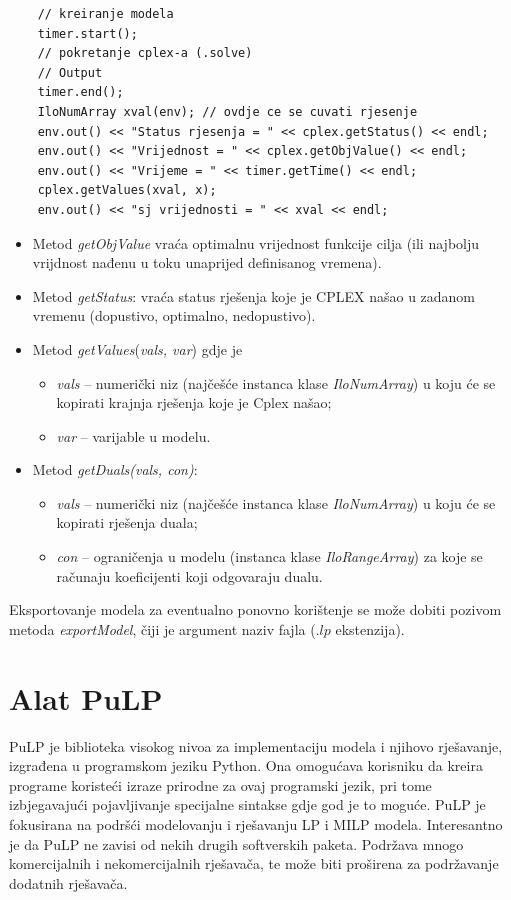 \documentclass[a4paper, utf8, 11pt, colorlinks]{book}
\begin{document}
 \begin{verbatim}
 	// kreiranje modela 
 	timer.start();
 	// pokretanje cplex-a (.solve)
 	// Output
 	timer.end();
 	IloNumArray xval(env); // ovdje ce se cuvati rjesenje
 	env.out() << "Status rjesenja = " << cplex.getStatus() << endl;
 	env.out() << "Vrijednost = " << cplex.getObjValue() << endl;
 	env.out() << "Vrijeme = " << timer.getTime() << endl;
 	cplex.getValues(xval, x);
 	env.out() << "sj vrijednosti = " << xval << endl;
 \end{verbatim}
\begin{itemize}
	\item Metod \emph{getObjValue} vraća optimalnu vrijednost funkcije cilja (ili najbolju vrijdnost nađenu u toku unaprijed definisanog vremena).
	\item Metod \emph{getStatus}: vraća status rješenja koje je CPLEX našao u zadanom vremenu (dopustivo, optimalno, nedopustivo).
	\item Metod \emph{getValues}(\emph{vals, var}) gdje je 
	\begin{itemize}
	 	  \item \emph{vals} -- numerički niz (najčešće instanca klase \emph{IloNumArray}) u koju će se kopirati krajnja rješenja koje je Cplex našao;    
          \item \emph{var} -- varijable u modelu.
    \end{itemize}
     \item Metod \emph{getDuals(vals, con)}:
     \begin{itemize}
     	\item \emph{vals} -- numerički niz (najčešće instanca klase \emph{IloNumArray}) u koju će se kopirati rješenja duala;
     	\item \emph{con} -- ograničenja u modelu (instanca klase \emph{IloRangeArray}) za koje se računaju koeficijenti koji odgovaraju dualu. 
     \end{itemize}
\end{itemize}
Eksportovanje modela za eventualno ponovno korištenje se može dobiti pozivom metoda \emph{exportModel}, čiji je argument naziv fajla (.$lp$ ekstenzija).  
 \section{Alat PuLP}
 PuLP je biblioteka visokog nivoa za implementaciju modela i njihovo rješavanje, izgrađena u programskom jeziku Python.  
 Ona omogućava korisniku da kreira programe koristeći izraze prirodne za ovaj programski jezik,  
 pri tome izbjegavajući pojavljivanje specijalne sintakse gdje god je to moguće. PuLP je fokusirana na podršći modelovanju i rješavanju LP i MILP modela. Interesantno je da PuLP 
 ne zavisi od nekih drugih softverskih paketa.   Podržava mnogo komercijalnih i nekomercijalnih rješavača, te može biti proširena za podržavanje dodatnih rješavača. 
 
\end{document}
